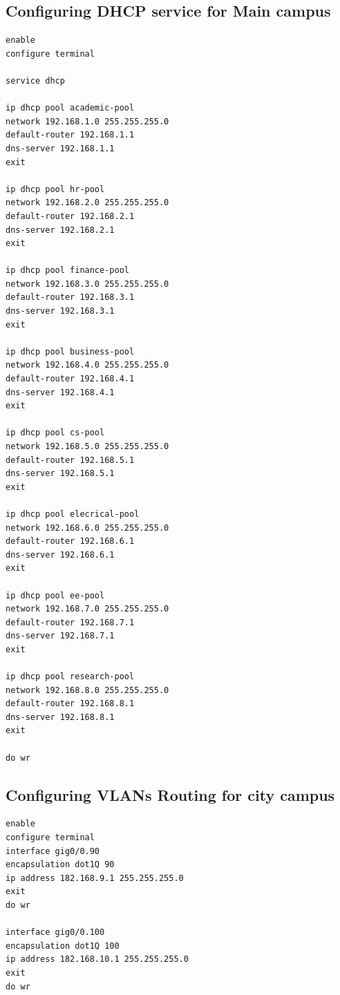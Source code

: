 \documentclass[12pt]{article}
\begin{document}
\subsection{Configuring DHCP service for Main campus }
\begin{verbatim}
enable
configure terminal

service dhcp

ip dhcp pool academic-pool
network 192.168.1.0 255.255.255.0
default-router 192.168.1.1
dns-server 192.168.1.1
exit

ip dhcp pool hr-pool
network 192.168.2.0 255.255.255.0
default-router 192.168.2.1
dns-server 192.168.2.1
exit

ip dhcp pool finance-pool
network 192.168.3.0 255.255.255.0
default-router 192.168.3.1
dns-server 192.168.3.1
exit

ip dhcp pool business-pool
network 192.168.4.0 255.255.255.0
default-router 192.168.4.1
dns-server 192.168.4.1
exit

ip dhcp pool cs-pool
network 192.168.5.0 255.255.255.0
default-router 192.168.5.1
dns-server 192.168.5.1
exit

ip dhcp pool elecrical-pool
network 192.168.6.0 255.255.255.0
default-router 192.168.6.1
dns-server 192.168.6.1
exit

ip dhcp pool ee-pool
network 192.168.7.0 255.255.255.0
default-router 192.168.7.1
dns-server 192.168.7.1
exit

ip dhcp pool research-pool
network 192.168.8.0 255.255.255.0
default-router 192.168.8.1
dns-server 192.168.8.1
exit

do wr

\end{verbatim}


















\subsection{Configuring VLANs Routing for city campus }
\begin{verbatim}
enable
configure terminal
interface gig0/0.90
encapsulation dot1Q 90
ip address 182.168.9.1 255.255.255.0
exit
do wr

interface gig0/0.100
encapsulation dot1Q 100
ip address 182.168.10.1 255.255.255.0
exit
do wr

\end{verbatim}
\end{document}
